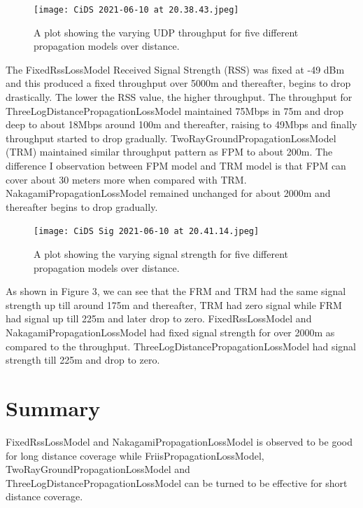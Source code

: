 \documentclass[a4paper, twocolumn, twoside, 12pt]{article}
\begin{document}
 \begin{figure}[h]
    \centering
    \texttt{[image: CiDS 2021-06-10 at 20.38.43.jpeg]}
    \caption {A plot showing the varying UDP throughput for five different propagation models over distance.\vspace{-0.8em}}
    \label{fig:GeneralDiagram}
 \end{figure}
 
The FixedRssLossModel Received Signal Strength (RSS) was fixed at -49 dBm and this produced a fixed throughput over 5000m and thereafter, begins to drop drastically. The lower the RSS value, the higher throughput. The throughput for ThreeLogDistancePropagationLossModel maintained 75Mbps in 75m and drop deep to about 18Mbps around 100m and thereafter, raising to 49Mbps and finally throughput started to drop gradually. TwoRayGroundPropagationLossModel (TRM) maintained similar throughput pattern as FPM to about 200m. The difference I observation between FPM model and TRM model is that FPM can cover about 30 meters more when compared with TRM.
NakagamiPropagationLossModel remained unchanged for about 2000m and thereafter begins to drop gradually.

 \begin{figure}[h]
    \centering
    \texttt{[image: CiDS Sig 2021-06-10 at 20.41.14.jpeg]}
    \caption {A plot showing the varying signal strength for five different propagation models over distance.\vspace{-0.8em}}
    \label{fig:GeneralDiagram}
 \end{figure}

As shown in Figure 3, we can see that the FRM and TRM had the same signal strength up till around 175m and thereafter, TRM had zero signal while FRM had signal up till 225m and later drop to zero. FixedRssLossModel and NakagamiPropagationLossModel had fixed signal strength for over 2000m as compared to the throughput. ThreeLogDistancePropagationLossModel had signal strength till 225m and drop to zero.

\section{Summary \vspace{-0.2em}}
FixedRssLossModel and NakagamiPropagationLossModel is observed to be good for long distance coverage while FriisPropagationLossModel, TwoRayGroundPropagationLossModel and ThreeLogDistancePropagationLossModel can be turned to be effective for short distance coverage.
\end{document}
